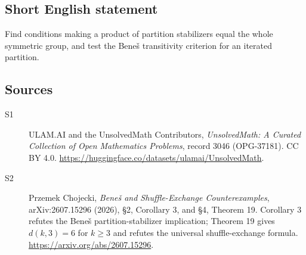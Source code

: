 \documentclass[11pt]{article}
\begin{document}
\subsection{Short English statement}
Find conditions making a product of partition stabilizers equal the whole symmetric group, and test the Beneš transitivity criterion for an iterated partition.
\subsection{Sources}
\begin{description}
\item[\hypertarget{source:3046:1}{S1}] ULAM.AI and the UnsolvedMath Contributors, \emph{UnsolvedMath: A Curated Collection of Open Mathematics Problems}, record 3046 (OPG-37181). CC BY 4.0. \url{https://huggingface.co/datasets/ulamai/UnsolvedMath}.
\item[\hypertarget{source:3046:2}{S2}] Przemek Chojecki, \emph{Beneš and Shuffle-Exchange Counterexamples}, arXiv:2607.15296 (2026), §2, Corollary 3, and §4, Theorem 19. Corollary 3 refutes the Beneš partition-stabilizer implication; Theorem 19 gives $d(k,3)=6$ for $k\geq3$ and refutes the universal shuffle-exchange formula. \url{https://arxiv.org/abs/2607.15296}.
\end{description}
\label{end:3046}
\end{document}

